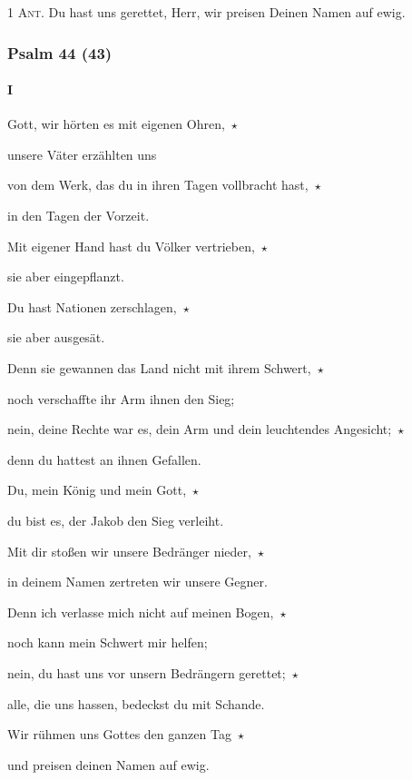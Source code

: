 \noindent \textsc{1 Ant.} Du hast uns gerettet, Herr, wir preisen Deinen Namen auf ewig.

\subsubsection{Psalm 44 (43)} \paragraph{I}

\noindent Gott, wir hörten es mit eigenen Ohren,~$\star$~\nopagebreak

unsere Väter erzählten uns

\noindent von dem Werk, das du in ihren Tagen vollbracht hast,~$\star$~\nopagebreak

in den Tagen der Vorzeit.

\noindent Mit eigener Hand hast du Völker vertrieben,~$\star$~\nopagebreak

sie aber eingepflanzt.

\noindent Du hast Nationen zerschlagen,~$\star$~\nopagebreak

sie aber ausgesät.

\noindent Denn sie gewannen das Land nicht mit ihrem Schwert,~$\star$~\nopagebreak

noch verschaffte ihr Arm ihnen den Sieg;

\noindent nein, deine Rechte war es, dein Arm und dein leuchtendes Angesicht;~$\star$~\nopagebreak

denn du hattest an ihnen Gefallen.

\noindent Du, mein König und mein Gott,~$\star$~\nopagebreak

du bist es, der Jakob den Sieg verleiht.

\noindent Mit dir stoßen wir unsere Bedränger nieder,~$\star$~\nopagebreak

in deinem Namen zertreten wir unsere Gegner.

\noindent Denn ich verlasse mich nicht auf meinen Bogen,~$\star$~\nopagebreak

noch kann mein Schwert mir helfen;

\noindent nein, du hast uns vor unsern Bedrängern gerettet;~$\star$~\nopagebreak

alle, die uns hassen, bedeckst du mit Schande.

\noindent Wir rühmen uns Gottes den ganzen Tag~$\star$~\nopagebreak

und preisen deinen Namen auf ewig.

